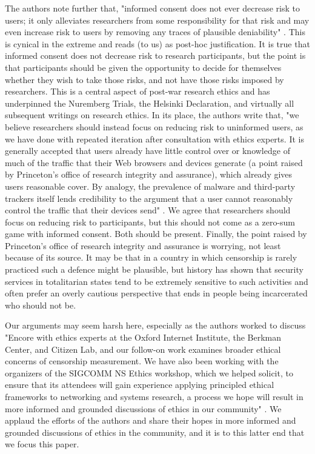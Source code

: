 \documentclass{svjour3}                     %
\begin{document}
The authors note further that, "informed consent does not ever decrease risk to users; it only alleviates researchers from some responsibility for that risk and may even increase risk to users by removing any traces of plausible deniability" \cite[p.~664] {burnett2015encore}. This is cynical in the extreme and reads (to us) as post-hoc justification.  It is true that informed consent does not decrease risk to research participants, but the point is that participants should be given the opportunity to decide for themselves whether they wish to take those risks, and not have those risks imposed by researchers. This is a central aspect of post-war research ethics and has underpinned the Nuremberg Trials, the Helsinki Declaration, and virtually all subsequent writings on research ethics.  In its place, the authors write that, "we believe researchers should instead focus on reducing risk to uninformed users, as we have done with repeated iteration after consultation with ethics experts. It is generally accepted that users already have little control over or knowledge of much of the traffic that their Web browsers and devices generate (a point raised by Princeton’s office of research integrity and assurance), which already gives users reasonable cover. By analogy, the prevalence of malware and third-party trackers itself lends credibility to the argument that a user cannot reasonably control the traffic that their devices send" \cite[p.~664-65] {burnett2015encore}. We agree that researchers should focus on reducing risk to participants, but this should not come as a zero-sum game with informed consent.  Both should be present. Finally, the point raised by Princeton's office of research integrity and assurance is worrying, not least because of its source.  It may be that in a country in which censorship is rarely practiced such a defence might be plausible, but history has shown that security services in totalitarian states tend to be extremely sensitive to such activities and often prefer an overly cautious perspective that ends in people being incarcerated who should not be.

Our arguments may seem harsh here, especially as the authors worked to discuss "Encore with ethics experts at the Oxford Internet Institute, the Berkman Center, and Citizen Lab, and our follow-on work examines broader ethical concerns of censorship measurement. We have also been working with the organizers of the SIGCOMM NS Ethics workshop, which we helped solicit, to ensure that its attendees will gain experience applying principled ethical frameworks to networking and systems research, a process we hope will result in more informed and grounded discussions of ethics in our community" \cite[p.~664] {burnett2015encore}. We applaud the efforts of the authors and share their hopes in more informed and grounded discussions of ethics in the community, and it is to this latter end that we focus this paper.
\end{document}
